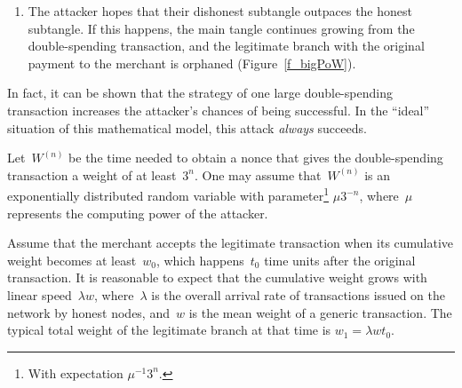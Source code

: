 \documentclass[12pt]{article}
\begin{document}
\begin{CJK}{UTF8}{bkai}
\begin{enumerate}
\item The attacker hopes that their dishonest subtangle outpaces 
the honest subtangle. If this happens, the main tangle continues 
growing from the double-spending transaction, and the legitimate 
branch with the original payment to the merchant is orphaned (Figure~\ref{f_bigPoW}).
\end{enumerate}
In fact, it can be shown that the strategy of one large double-spending 
transaction increases the attacker's chances of being successful. 
In the ``ideal'' situation of this mathematical model, this attack
\emph{always} succeeds. 

Let~$W^{(n)}$ be the time needed to obtain a nonce that 
gives the double-spending transaction a weight of at
 least~$3^n$.
One may assume that~$W^{(n)}$ is an exponentially distributed
random variable with parameter\footnote{With 
expectation $\mu^{-1}3^n$.} $\mu 3^{-n}$, where~$\mu$ represents the computing 
power of the attacker. 

Assume that the merchant 
accepts the legitimate transaction when its cumulative 
weight becomes at least~$w_0$, which happens~$t_0$
time units after the original transaction. It is reasonable
to expect that the cumulative weight grows with linear
speed~$\lambda w$, where~$\lambda$ is the overall arrival rate
of transactions issued on the network by honest nodes,
 and~$w$ is the mean weight
of a generic transaction. The typical total weight of the legitimate 
branch at that time is $w_1=\lambda w t_0$.


\end{CJK}
\end{document}
